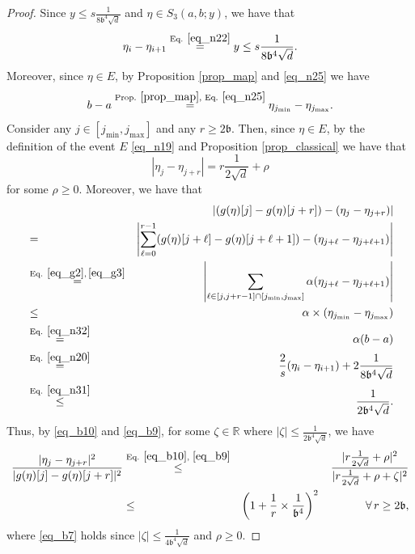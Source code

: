\documentclass[11pt,letterpaper]{article}
\begin{document}
\begin{proof}
%
Since  $y \leq s\frac{1}{8\mathfrak{b}^4\sqrt{d} }$ and $\eta \in  S_3(a,b;y)$, 
%
we have that
%
\begin{equation}\label{eq_n31}
    \eta_i-\eta_{i+1} \stackrel{\textrm{Eq. } \eqref{eq_n22}}{=} y \leq s\frac{1}{8\mathfrak{b}^4\sqrt{d} }.
    \end{equation}
%
Moreover, since $\eta \in E$, by Proposition \ref{prop_map} and \eqref{eq_n25} we have
%
\begin{equation}\label{eq_n32}
    b-a  \stackrel{\textrm{Prop. } \ref{prop_map}, \textrm{ Eq. } \eqref{eq_n25}}{=} \eta_{j_{\mathrm{min}}} - \eta_{j_{\mathrm{max}}}.
    \end{equation}
%
Consider any $j \in [j_{\mathrm{min}}, j_{\mathrm{max}}]$ and any $r \geq 2\mathfrak{b}$.
%
Then, since $\eta \in E$,  by the definition of the event $E$ \eqref{eq_n19} and Proposition \ref{prop_classical} we have that 
%
\begin{equation}\label{eq_b10}
    |\eta_j - \eta_{j+r} | = r \frac{1}{2\sqrt{d}} + \rho
\end{equation}
for some $\rho \geq 0$.
%
Moreover, we have that 
%
\begin{eqnarray}\label{eq_b9}
& & \!\!\!\!\!\!\!\!\!\!\!\!\!\!\!\!\!\!\!\!\!\!\!\!\!\!\!\!\!\!\!\!\!\!\!\!\!\!\!\!\!\!\!\!\!\!\!\! |(g(\eta)[j] - g(\eta)[j+r]) - (\eta_j - \eta_{j+r})|
%
\nonumber \\
%
&=&\left|\sum_{\ell=0}^{r-1} (g(\eta)[j+\ell] - g(\eta)[j+\ell+1]) - (\eta_{j+\ell} - \eta_{j+\ell+1})\right|\nonumber\\
%
&\stackrel{\textrm{Eq. } \eqref{eq_g2},\, \eqref{eq_g3}}{=}& \left |\sum_{\ell\in [j, j+r-1] \cap [j_{\mathrm{min}}, j_{\mathrm{max}}]} \alpha (\eta_{j+\ell} - \eta_{j+\ell+1}) \right |\nonumber\\
%
& \leq &\alpha \times (\eta_{j_{\mathrm{min}}} - \eta_{j_{\mathrm{max}}}) \nonumber\\
   &\stackrel{\textrm{Eq. } \eqref{eq_n32}}{=}& \alpha (b-a)    \nonumber\\
    &\stackrel{\textrm{Eq. } \eqref{eq_n20}}{=}&  \frac{2}{s}(\eta_{i}- \eta_{i+1}) +2\frac{1}{8\mathfrak{b}^4\sqrt{d}}    \nonumber\\
    &\stackrel{\textrm{Eq. } \eqref{eq_n31}}{\leq}& \frac{1}{2\mathfrak{b}^4\sqrt{d}}.
\end{eqnarray}
%
%
Thus, by \eqref{eq_b10} and \eqref{eq_b9}, for some $\zeta \in \mathbb{R}$ where $|\zeta| \leq \frac{1}{2\mathfrak{b}^4\sqrt{d}}$, we have 
%
\begin{eqnarray} 
 \frac{| \eta_{j} - \eta_{j+r}|^2}{| g(\eta)[j] - g(\eta)[j+r]|^2} 
& \stackrel{\textrm{Eq. } \eqref{eq_b10}, \, \, \eqref{eq_b9}}{\leq} & \frac{|  r \frac{1}{2\sqrt{d}} + \rho  |^2}{| r \frac{1}{2\sqrt{d}} + \rho + \zeta|^2}  \nonumber\\
%
&\leq & \left(1+ \frac{1}{r}   \times \frac{1}{\mathfrak{b}^4}\right)^2  \qquad \qquad \forall \, r \geq 2\mathfrak{b}, \label{eq_b7}
%
\end{eqnarray}
%
where \eqref{eq_b7} holds since  $|\zeta| \leq \frac{1}{4\mathfrak{b}^4\sqrt{d}}$ and $\rho\geq 0$.
%
%


\end{proof}
\end{document}
